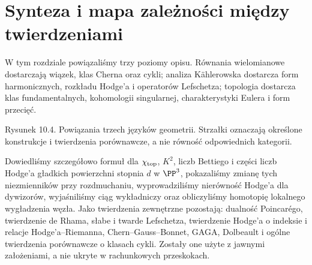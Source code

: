 \section{Synteza i mapa zależności między twierdzeniami}
\label{sec:ga10-koniec}

W tym rozdziale powiązaliśmy trzy poziomy opisu.
Równania wielomianowe dostarczają wiązek, klas Cherna
oraz cykli; analiza Kählerowska dostarcza form
harmonicznych, rozkładu Hodge'a i operatorów Lefschetza;
topologia dostarcza klas fundamentalnych, kohomologii
singularnej, charakterystyki Eulera i form przecięć.

\begin{center}

{\small Rysunek 10.4. Powiązania trzech języków geometrii.
Strzałki oznaczają określone konstrukcje i twierdzenia
porównawcze, a nie równość odpowiednich kategorii.}\par
\end{center}

\begin{uwaga}
Dowiedliśmy szczegółowo formuł dla $\chi_{\rm top}$,
$K^2$, liczb Bettiego i części liczb Hodge'a
gładkich powierzchni stopnia $d$ w $\PP^3$,
pokazaliśmy zmianę tych niezmienników przy rozdmuchaniu,
wyprowadziliśmy nierówność Hodge'a dla dywizorów,
wyjaśniliśmy ciąg wykładniczy oraz obliczyliśmy
homotopię lokalnego wygładzenia węzła.
Jako twierdzenia zewnętrzne pozostają: dualność Poincarégo,
twierdzenie de Rhama, słabe i twarde Lefschetza,
twierdzenie Hodge'a o indeksie i relacje Hodge'a--Riemanna,
Chern--Gauss--Bonnet, GAGA, Dolbeault i ogólne twierdzenia
porównawcze o klasach cykli. Zostały one użyte z jawnymi
założeniami, a nie ukryte w rachunkowych przeskokach.
\end{uwaga}


